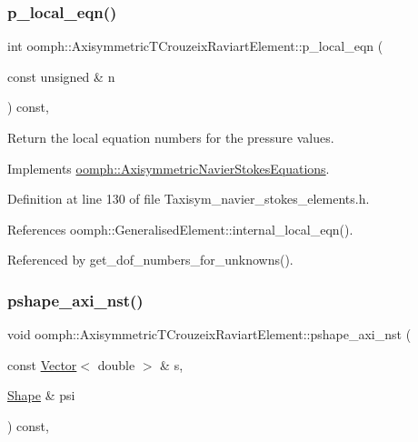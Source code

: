 \subsubsection{\texorpdfstring{p\+\_\+local\+\_\+eqn()}{p\_local\_eqn()}}
{\footnotesize\ttfamily int oomph\+::\+Axisymmetric\+T\+Crouzeix\+Raviart\+Element\+::p\+\_\+local\+\_\+eqn (\begin{DoxyParamCaption}\item[{const unsigned \&}]{n }\end{DoxyParamCaption}) const\hspace{0.3cm}{\ttfamily [inline]}, {\ttfamily [virtual]}}



Return the local equation numbers for the pressure values. 



Implements \hyperlink{classoomph_1_1AxisymmetricNavierStokesEquations_ad6ac62ca5fa411c365fd2ecc72aa25e8}{oomph\+::\+Axisymmetric\+Navier\+Stokes\+Equations}.



Definition at line 130 of file Taxisym\+\_\+navier\+\_\+stokes\+\_\+elements.\+h.



References oomph\+::\+Generalised\+Element\+::internal\+\_\+local\+\_\+eqn().



Referenced by get\+\_\+dof\+\_\+numbers\+\_\+for\+\_\+unknowns().

\mbox{\label{classoomph_1_1AxisymmetricTCrouzeixRaviartElement_afd3664b820b924b9509f4f75eaf7420c}} 
\subsubsection{\texorpdfstring{pshape\+\_\+axi\+\_\+nst()}{pshape\_axi\_nst()}\hspace{0.1cm}{\footnotesize\ttfamily [1/2]}}
{\footnotesize\ttfamily void oomph\+::\+Axisymmetric\+T\+Crouzeix\+Raviart\+Element\+::pshape\+\_\+axi\+\_\+nst (\begin{DoxyParamCaption}\item[{const \hyperlink{classoomph_1_1Vector}{Vector}$<$ double $>$ \&}]{s,  }\item[{\hyperlink{classoomph_1_1Shape}{Shape} \&}]{psi }\end{DoxyParamCaption}) const\hspace{0.3cm}{\ttfamily [inline]}, {\ttfamily [virtual]}}




